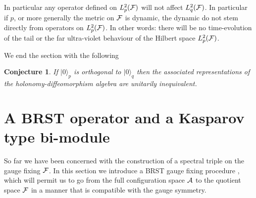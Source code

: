 \documentclass[letterpaper,11pt]{article}
\def\ca{{\cal A}}
\def\cf{{\cal F}}
\newtheorem{conj}[thm]{Conjecture}
\begin{document}
In particular any operator defined on $L^2_p(\cf )$ will not affect $L^2_q(\cf )$. In particular if $p$, or more generally the metric on $\cf$ is dynamic, the dynamic do not stem directly from operators on $L^2_p(\cf )$. In other words: there will be no time-evolution of the tail or the far ultra-violet behaviour of the Hilbert space $L^2_p(\cf )$.


We end the section with the following
\begin{conj}
If $|0\rangle_p$ is orthogonal to $|0\rangle_q$ then the associated representations of the holonomy-diffeomorphism algebra are unitarily inequivalent.
\end{conj}






\section{A BRST operator and a Kasparov type bi-module}
\label{BRST} 

So far we have been concerned with the construction of a spectral triple on the gauge fixing $\cf$. 
In this section we introduce a BRST gauge fixing procedure \cite{Becchi:1975nq,Tyutin:1975qk,Barnich:2000zw,Henneaux:1992ig}, which will permit us to go from the full configuration space $\ca$ to the quotient space $\cf$ in a manner that is compatible with the gauge symmetry.\\
\end{document}
